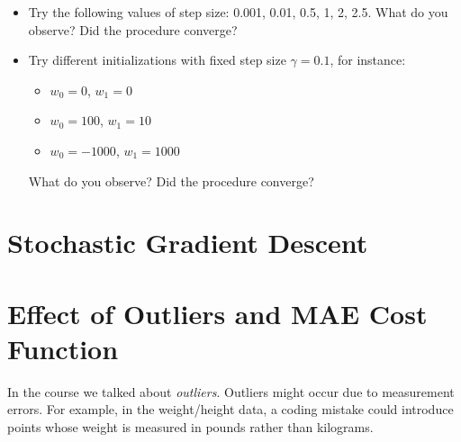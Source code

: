 \documentclass{../tex_import/ETHuebung_english}
\begin{document}
{\begin{enumerate}
\begin{itemize}
\item Try the following values of step size: 0.001, 0.01, 0.5, 1, 2, 2.5.
What do you observe? Did the procedure converge?

\item Try different initializations with fixed step size $\gamma=0.1$, for instance:
    \begin{itemize}
        \item $w_0=0$, $w_1=0$
        \item $w_0=100$, $w_1=10$
        \item $w_0=-1000$, $w_1=1000$
    \end{itemize}
    What do you observe? Did the procedure converge?
\end{itemize}

\end{enumerate}
}

\section{Stochastic Gradient Descent}

\section{Effect of Outliers and MAE Cost Function}
In the course we talked about \emph{outliers}.
Outliers might occur due to measurement errors.
For example, in the weight/height data, a coding mistake could introduce points
whose weight is measured in pounds rather than kilograms.
\end{document}
